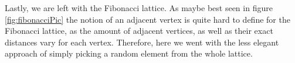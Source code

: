 Lastly, we are left with the Fibonacci lattice. As maybe best seen in figure \ref{fig:fibonacciPic} the notion of an adjacent vertex is quite hard to define for the Fibonacci lattice, as the amount of adjacent vertices, as well as their exact distances vary for each vertex. Therefore, here we went with the less elegant approach of simply picking a random element from the whole lattice.

